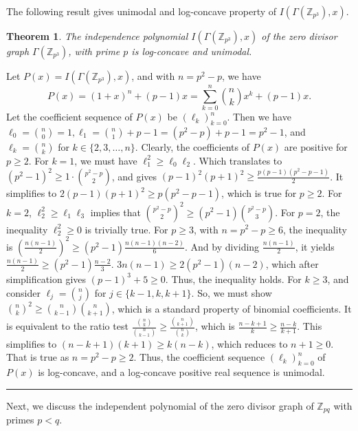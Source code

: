 \documentclass[12pt,twoside]{article}
\newtheorem{theorem}{Theorem}[section]
\renewenvironment{proof}{{\noindent\bfseries Proof.}}{\qed}
\def\qed{\nolinebreak\hfill\rule{.2cm}{.2cm}\par\addvspace{.5cm}}
\begin{document}
The following result gives unimodal and log-concave property of $I(\varGamma(\mathbb{Z}_{p^3}), x).$
\begin{theorem}
	The independence polynomial $I(\varGamma(\mathbb{Z}_{p^3}), x)$ of the zero divisor graph $ \varGamma(\mathbb{Z}_{p^3})$, with prime $p$ is log-concave and  unimodal.
\end{theorem}
\begin{proof}
	Let $P(x) = I(\varGamma(\mathbb{Z}_{p^3}), x)$, and with $n = p^2-p$, we have
	$$P(x) = (1+x)^n + (p-1)x = \sum_{k=0}^n \binom{n}{k}x^k + (p-1)x.$$
	Let the coefficient sequence of $P(x)$ be $(\ell_k)_{k=0}^n$. Then we have
	$\ell_0 = \binom{n}{0} = 1, \ell_1 = \binom{n}{1} + p-1 = (p^2-p) + p-1 = p^2-1$, and  $\ell_k = \binom{n}{k}$ for $k \in \{2, 3, \dots, n\}.$
	Clearly, the coefficients of $P(x)$ are positive for $p \ge 2$. For $k=1$, we must have $\ell_1^2 \ge \ell_0 \ell_2$. Which translates to $(p^2-1)^2 \ge 1 \cdot \binom{p^2-p}{2}$, and gives $(p-1)^2(p+1)^2 \ge \tfrac{p(p-1)(p^2-p-1)}{2}$. It simplifies to  $2(p-1)(p+1)^2 \ge p(p^2-p-1)$, which is true for $p\geq 2.$ For $k=2$,  $\ell_2^2 \ge \ell_1 \ell_3$ implies that  $\binom{p^2-p}{2}^2 \ge (p^2-1)\binom{p^2-p}{3}$.
	For $p=2$,  the inequality $\ell_2^2 \ge 0$ is trivially true. For $p \ge 3$, with $n=p^2-p \ge 6$, the inequality is
	$\left(\tfrac{n(n-1)}{2}\right)^2 \ge (p^2-1)\tfrac{n(n-1)(n-2)}{6}$. And by dividing $\tfrac{n(n-1)}{2}$, it yields $\tfrac{n(n-1)}{2} \ge (p^2-1)\tfrac{n-2}{3}$.
	$3n(n-1) \ge 2(p^2-1)(n-2)$, which after simplification gives $(p-1)^3+5 \ge 0$. Thus, the inequality holds. For  $k \ge 3$, and consider  $\ell_{j} = \binom{n}{j}$ for $j \in \{k-1, k, k+1\}$. So, we must show $\binom{n}{k}^2 \ge \binom{n}{k-1}\binom{n}{k+1}$, which is a standard property of binomial coefficients. It is equivalent to the ratio test $\tfrac{\binom{n}{k}}{\binom{n}{k-1}} \ge \tfrac{\binom{n}{k+1}}{\binom{n}{k}}$, which is $\tfrac{n-k+1}{k} \ge \tfrac{n-k}{k+1}$. This simplifies to $(n-k+1)(k+1) \ge k(n-k)$, which reduces to $n+1 \ge 0$. That is true as $n=p^2-p \ge 2$. Thus, the coefficient sequence $(\ell_k)_{k=0}^n$ of $P(x)$ is log-concave, and a log-concave positive real sequence is  unimodal. 
\end{proof}




Next, we discuss the independent  polynomial of the zero divisor graph of $\mathbb{Z}_{pq}$ with primes $p<q$.
\end{document}
